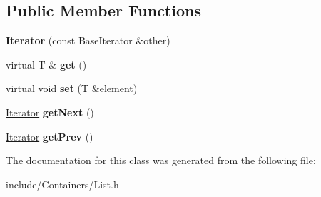 \subsection*{Public Member Functions}
\begin{DoxyCompactItemize}
\item 
{\bfseries Iterator} (const Base\+Iterator \&other)\hypertarget{classDE_1_1List_1_1Iterator_aec3de14e44866dc96439a44e484756bd}{}\label{classDE_1_1List_1_1Iterator_aec3de14e44866dc96439a44e484756bd}

\item 
virtual T \& {\bfseries get} ()\hypertarget{classDE_1_1List_1_1Iterator_a4e83d04d4bc5e7715cf8535be70f8796}{}\label{classDE_1_1List_1_1Iterator_a4e83d04d4bc5e7715cf8535be70f8796}

\item 
virtual void {\bfseries set} (T \&element)\hypertarget{classDE_1_1List_1_1Iterator_a76effe78048f7c8b0b7b7cc9e24044be}{}\label{classDE_1_1List_1_1Iterator_a76effe78048f7c8b0b7b7cc9e24044be}

\item 
\hyperlink{classDE_1_1List_1_1Iterator}{Iterator} {\bfseries get\+Next} ()\hypertarget{classDE_1_1List_1_1Iterator_ae74a3fdd51d427c989adee0fbe218c3c}{}\label{classDE_1_1List_1_1Iterator_ae74a3fdd51d427c989adee0fbe218c3c}

\item 
\hyperlink{classDE_1_1List_1_1Iterator}{Iterator} {\bfseries get\+Prev} ()\hypertarget{classDE_1_1List_1_1Iterator_a335fea104b4908acad300498de017156}{}\label{classDE_1_1List_1_1Iterator_a335fea104b4908acad300498de017156}

\end{DoxyCompactItemize}


The documentation for this class was generated from the following file\+:\begin{DoxyCompactItemize}
\item 
include/\+Containers/List.\+h\end{DoxyCompactItemize}
